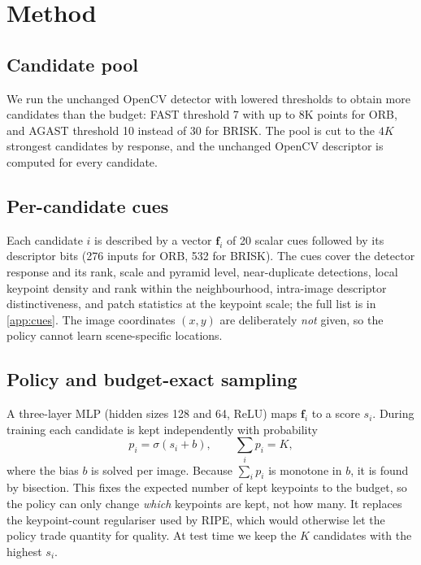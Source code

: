 \documentclass[10pt,twocolumn,letterpaper]{article}
\begin{document}
\section{Method}
\label{sec:method}

\subsection{Candidate pool}
We run the unchanged OpenCV detector with lowered thresholds to obtain more candidates than the budget:
FAST threshold 7 with up to 8K points for ORB, and AGAST threshold 10 instead of 30 for BRISK. The pool
is cut to the $4K$ strongest candidates by response, and the unchanged OpenCV descriptor is computed for
every candidate.

\subsection{Per-candidate cues}
Each candidate $i$ is described by a vector $\mathbf{f}_i$ of 20 scalar cues followed by its descriptor
bits (276 inputs for ORB, 532 for BRISK). The cues cover the detector response and its rank, scale and
pyramid level, near-duplicate detections, local keypoint density and rank within the neighbourhood,
intra-image descriptor distinctiveness, and patch statistics at the keypoint scale; the full list is in
\cref{app:cues}. The image coordinates $(x,y)$ are deliberately \emph{not} given, so the policy cannot
learn scene-specific locations.

\subsection{Policy and budget-exact sampling}
A three-layer MLP (hidden sizes 128 and 64, ReLU) maps $\mathbf{f}_i$ to a score $s_i$. During training
each candidate is kept independently with probability
\begin{equation}
  p_i = \sigma(s_i + b), \qquad \textstyle\sum_i p_i = K,
  \label{eq:bias}
\end{equation}
where the bias $b$ is solved per image. Because $\sum_i p_i$ is monotone in $b$, it is found by
bisection. This fixes the expected number of kept keypoints to the budget, so the policy can only change
\emph{which} keypoints are kept, not how many. It replaces the keypoint-count regulariser used by RIPE,
which would otherwise let the policy trade quantity for quality. At test time we keep the $K$
candidates with the highest $s_i$.
\end{document}
